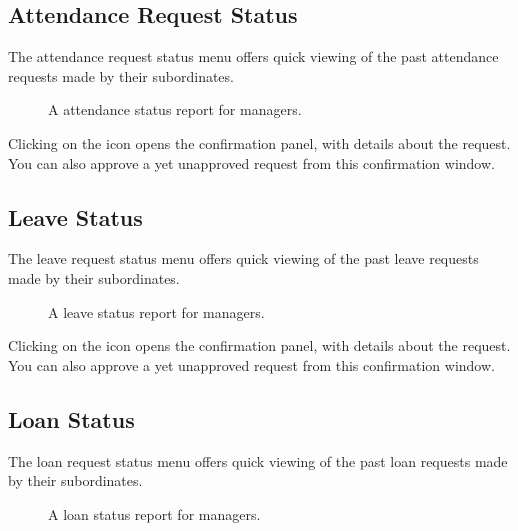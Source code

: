 \documentclass[letterpaper,10pt,english]{sphinxmanual}
\begin{document}
\subsection{Attendance Request Status}
\label{\detokenize{manager/status-reporting:attendance-request-status}}
The attendance request status menu offers quick viewing of the past attendance requests made by their subordinates.

\begin{figure}[htbp]
\centering
\capstart

\noindent{}
\caption{A attendance status report for managers.}\label{\detokenize{manager/status-reporting:id3}}\end{figure}

Clicking on the  \sphinxstyleemphasis{} icon opens the confirmation panel, with details about the request. You can also approve a yet unapproved request from this confirmation window.


\subsection{Leave Status}
\label{\detokenize{manager/status-reporting:leave-status}}
The leave request status menu offers quick viewing of the past leave requests made by their subordinates.

\begin{figure}[htbp]
\centering
\capstart

\noindent{}
\caption{A leave status report for managers.}\label{\detokenize{manager/status-reporting:id4}}\end{figure}

Clicking on the  \sphinxstyleemphasis{} icon opens the confirmation panel, with details about the request. You can also approve a yet unapproved request from this confirmation window.


\subsection{Loan Status}
\label{\detokenize{manager/status-reporting:loan-status}}
The loan request status menu offers quick viewing of the past loan requests made by their subordinates.

\begin{figure}[htbp]
\centering
\capstart

\noindent{}
\caption{A loan status report for managers.}\label{\detokenize{manager/status-reporting:id5}}\end{figure}
\end{document}
